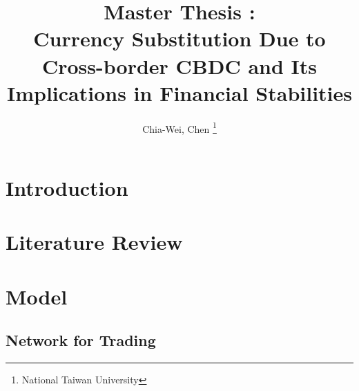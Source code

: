 \documentclass[12pt, a4paper]{article}
\title{Master Thesis : \\
Currency Substitution Due to Cross-border CBDC and Its Implications in Financial Stabilities}
\author{Chia-Wei, Chen \thanks{National Taiwan University}}
\theoremstyle{definition}
\begin{document}
    \maketitle
    \begin{abstract}
        
    \end{abstract}


    \section{Introduction} \label{sec-into}
    
    \section{Literature Review} \label{sec-lit}
    
    \section{Model} \label{sec-model}
    


    
    

    \newpage
    \begin{appendices}
        \section{Network for Trading} \label{sec-network}
    \end{appendices}
\end{document}
